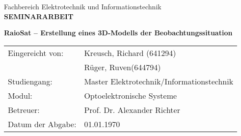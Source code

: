     \noindent
	\thispagestyle{empty}
	\vspace*{1.5mm}
	\begin{center}
	\end{center}
	\begin{center}
		\vspace*{20mm}
        \large
        Fachbereich Elektrotechnik und Informationstechnik\\
        \vspace*{12mm}
        \huge
        \textbf{SEMINARARBEIT}\\
        \large
        \vspace*{14.5mm}
        \Large
        \begin{spacing}{1.3}
        \textbf{RaioSat -- Erstellung eines 3D-Modells der Beobachtungssituation}
        \end{spacing}
        \vspace{39mm} 
\begin{spacing}{1.8}
\begin{large}
\begin{tabular}{ l l } 
 Eingereicht von: & Kreusch, Richard \hspace{4mm}(641294) \\
 & Rüger, Ruven\hspace{12.5mm}(644794)\\
 Studiengang: & Master Elektrotechnik/Informationstechnik \\
 Modul:& Optoelektronische Systeme \\
 Betreuer: & Prof. Dr. Alexander Richter\\
 Datum der Abgabe: & 01.01.1970\\

\end{tabular}
\end{large}
\end{spacing}      
\end{center}
\vspace{3mm}
\begin{center}
\end{center}
\restoregeometry
\newpage


